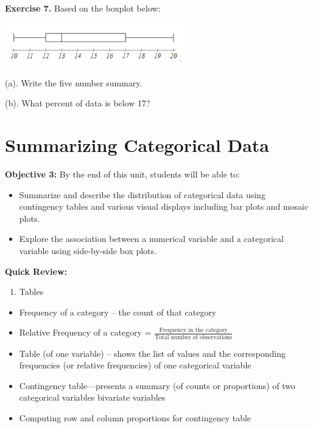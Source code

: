 \documentclass[
]{book}
\providecommand{\tightlist}{%
  \setlength{\itemsep}{0pt}\setlength{\parskip}{0pt}}
\begin{document}
\textbf{Exercise 7.} Based on the boxplot below:

\includegraphics[width=3.08333in,height=\textheight]{images/img27.png}

(a). Write the five number summary.

(b). What percent of data is below 17?

\newpage

\section{Summarizing Categorical Data}\label{summarizing-categorical-data}

\textbf{Objective 3:} By the end of this unit, students will be able to:

\begin{itemize}
\tightlist
\item
  Summarize and describe the distribution of categorical data using contingency tables and various visual displays including bar plots and mosaic plots.
\item
  Explore the association between a numerical variable and a categorical variable using side-by-side box plots.
\end{itemize}

\textbf{Quick Review:}

\begin{enumerate}
\def\labelenumi{\arabic{enumi}.}
\tightlist
\item
  Tables
\end{enumerate}

\begin{itemize}
\tightlist
\item
  Frequency of a category -- the count of that category
\item
  Relative Frequency of a category = \(\frac{\text{Frequency in the category}}{\text{Total number of observations}}\)
\item
  Table (of one variable) -- shows the list of values and the corresponding frequencies (or relative frequencies) of one categorical variable
\item
  Contingency table---presents a summary (of counts or proportions) of two categorical variables bivariate variables
\item
  Computing row and column proportions for contingency table
\end{itemize}
\end{document}
